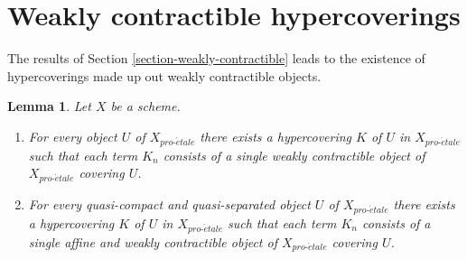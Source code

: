 \documentclass{stacks-project}
\theoremstyle{plain}
\newtheorem{lemma}[subsection]{Lemma}
\theoremstyle{definition}
\theoremstyle{remark}
\numberwithin{equation}{subsection}
\def\proetale{{pro\text{-}\acute{e}tale}}
\begin{document}
\section{Weakly contractible hypercoverings}
\label{section-hypercovering}

\noindent
The results of Section \ref{section-weakly-contractible}
leads to the existence of hypercoverings made up out weakly
contractible objects.

\begin{lemma}
\label{lemma-w-contractible-hypercovering}
Let $X$ be a scheme.
\begin{enumerate}
\item For every object $U$ of $X_\proetale$ there exists a hypercovering
$K$ of $U$ in $X_\proetale$ such that each term $K_n$ consists of a
single weakly contractible object of $X_\proetale$ covering $U$.
\item For every quasi-compact and quasi-separated object $U$ of $X_\proetale$
there exists a hypercovering $K$ of $U$ in $X_\proetale$ such that each
term $K_n$ consists of a single affine and weakly contractible object of
$X_\proetale$ covering $U$.
\end{enumerate}
\end{lemma}
\end{document}
